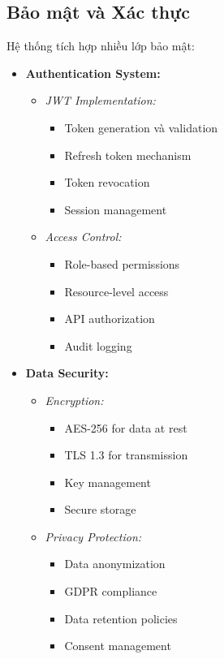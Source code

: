 \subsection{Bảo mật và Xác thực}
\hspace{0.5cm}Hệ thống tích hợp nhiều lớp bảo mật:

\begin{itemize}
    \item \textbf{Authentication System:}
    \begin{itemize}
        \item \textit{JWT Implementation:}
        \begin{itemize}
            \item Token generation và validation
            \item Refresh token mechanism
            \item Token revocation
            \item Session management
        \end{itemize}
        \item \textit{Access Control:}
        \begin{itemize}
            \item Role-based permissions
            \item Resource-level access
            \item API authorization
            \item Audit logging
        \end{itemize}
    \end{itemize}
    
    \item \textbf{Data Security:}
    \begin{itemize}
        \item \textit{Encryption:}
        \begin{itemize}
            \item AES-256 for data at rest
            \item TLS 1.3 for transmission
            \item Key management
            \item Secure storage
        \end{itemize}
        \item \textit{Privacy Protection:}
        \begin{itemize}
            \item Data anonymization
            \item GDPR compliance
            \item Data retention policies
            \item Consent management
        \end{itemize}
    \end{itemize}
\end{itemize}


